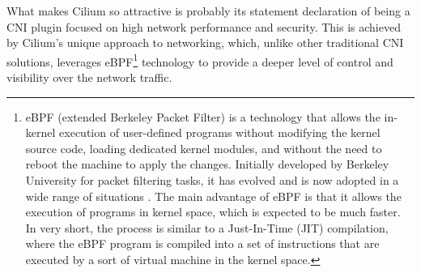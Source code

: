 What makes Cilium so attractive is probably its statement declaration of being a
CNI plugin focused on high network performance and security.
This is achieved by Cilium's unique approach to networking, which, unlike other
traditional CNI solutions, leverages eBPF\footnote{
  eBPF (extended Berkeley Packet Filter) is a technology that allows the
  in-kernel execution of user-defined programs without modifying the kernel
  source code, loading dedicated kernel modules, and without the need to reboot
  the machine to apply the changes. Initially developed by Berkeley University
  for packet filtering tasks, it has evolved and is now adopted in a wide range
  of situations \cite{Hedam2021}. The main advantage of eBPF is that it allows
  the execution of programs in kernel space, which is expected to be much
  faster. In very short, the process is similar to a Just-In-Time (JIT)
  compilation, where the eBPF program is compiled into a set of instructions
  that are executed by a sort of virtual machine in the kernel
  space\cite{Sharaf2022}.
} technology to provide a deeper level of control and visibility over the
network traffic.

